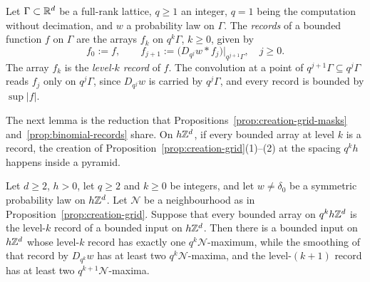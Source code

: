 \begin{definition}
\label{def:level-records}

Let $\Gamma \subset \mathbb{R}^d$ be a full-rank lattice, $q \ge 1$ an integer, $q = 1$ being the computation without decimation, and $w$ a probability law on
$\Gamma$. The \emph{records} of a bounded function $f$ on $\Gamma$ are the arrays $f_k$ on
$q^k\Gamma$, $k \ge 0$, given by
\[
f_0 := f, \qquad f_{j+1} := \bigl(D_{q^j}w * f_j\bigr)\big|_{q^{j+1}\Gamma}, \quad j \ge 0 .
\]
The array $f_k$ is the \emph{level-$k$ record} of $f$. The convolution at a point of
$q^{j+1}\Gamma \subseteq q^j\Gamma$ reads $f_j$ only on $q^j\Gamma$, since $D_{q^j}w$ is carried by
$q^j\Gamma$, and every record is bounded by $\sup|f|$.
\end{definition}

The next lemma is the reduction that Propositions~\ref{prop:creation-grid-masks}
and~\ref{prop:binomial-records} share. On $h\mathbb{Z}^d$, if every bounded array at level $k$ is a record,
the creation of Proposition~\ref{prop:creation-grid}(1)--(2) at the spacing $q^kh$ happens inside a
pyramid.

\begin{lemma}
\label{lem:records-creation}

Let $d \ge 2$, $h > 0$, let $q \ge 2$ and $k \ge 0$ be integers, and let $w \ne \delta_0$ be a
symmetric probability law on $h\mathbb{Z}^d$. Let $\mathcal{N}$ be a
neighbourhood as in Proposition~\ref{prop:creation-grid}. Suppose that every bounded array on
$q^kh\mathbb{Z}^d$ is the level-$k$ record of a bounded input on $h\mathbb{Z}^d$. Then there is a bounded input on
$h\mathbb{Z}^d$ whose level-$k$ record has exactly one $q^k\mathcal{N}$-maximum, while the smoothing of that
record by $D_{q^k}w$ has at least two $q^k\mathcal{N}$-maxima, and the level-$(k+1)$ record has at
least two $q^{k+1}\mathcal{N}$-maxima.
\end{lemma}

